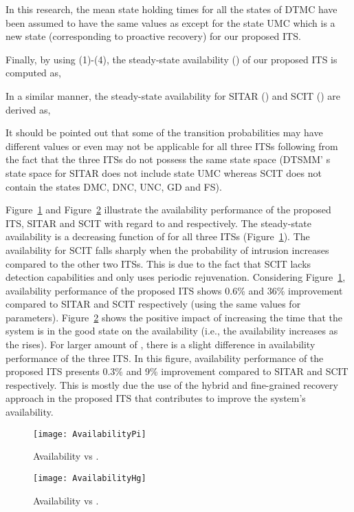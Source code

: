 \documentclass[preprint,number,12pt]{elsarticle}
\begin{document}
\begin{center}
\scalebox{0.9}{
 {} = 
}
\end{center}

In this research, the mean state holding times  for all the states of DTMC have been assumed to have the same values as\citep{Madan2004167} except for the state UMC which is a new state (corresponding to proactive recovery) for our proposed ITS.

Finally, by using (1)-(4), the steady-state availability () of our proposed ITS is computed as,

In a similar manner, the steady-state availability for SITAR () and SCIT () are derived as,



It should be pointed out that some of the transition probabilities may have different values or even may not be applicable for all three ITSs following from the fact that the three ITSs do not possess the same state space (DTSMM' s state space for SITAR does not include state UMC whereas SCIT does not contain the states DMC, DNC, UNC, GD and FS).

Figure~\ref{fig:AvailbilitypI} and Figure~\ref{fig:AvailbilityhG} illustrate the availability performance of the proposed ITS, SITAR and SCIT with regard to  and  respectively. The steady-state availability is a decreasing function of  for all three ITSs (Figure~\ref{fig:AvailbilitypI}). The availability for SCIT falls sharply when the probability of intrusion increases compared to the other two ITSs. This is due to the fact that SCIT lacks detection capabilities and only uses periodic rejuvenation. Considering Figure~\ref{fig:AvailbilitypI}, availability performance of the proposed ITS shows 0.6\% and 36\% improvement compared to SITAR and SCIT respectively (using the same values for parameters). Figure~\ref{fig:AvailbilityhG} shows the positive impact of increasing the time that the system is in the good state on the availability (i.e., the availability increases as the  rises). For larger amount of , there is a slight difference in availability performance of the three ITS. In this figure, availability performance of the proposed ITS presents 0.3\% and 9\% improvement compared to SITAR and SCIT respectively. This is mostly due the use of the hybrid and fine-grained recovery approach in the proposed ITS that contributes to improve the system's availability.

\begin{figure}[!t]
\centering
\texttt{[image: AvailabilityPi]}
\caption{Availability vs .}
\label{fig:AvailbilitypI}
\end{figure}
\begin{figure}[!t]
\centering
\texttt{[image: AvailabilityHg]}
\caption{Availability vs .} 
\label{fig:AvailbilityhG}
\end{figure}
\end{document}
